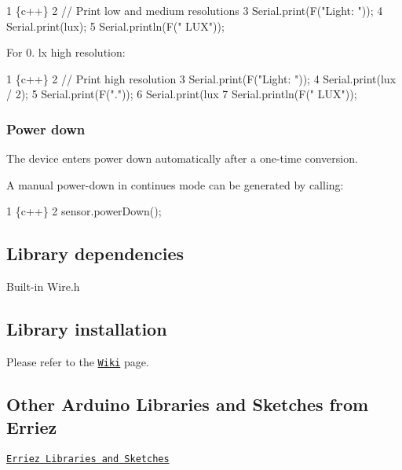 \begin{DoxyCode}
1 \{c++\}
2 // Print low and medium resolutions
3 Serial.print(F("Light: "));
4 Serial.print(lux);
5 Serial.println(F(" LUX"));
\end{DoxyCode}


For 0. lx high resolution\+:


\begin{DoxyCode}
1 \{c++\}
2 // Print high resolution
3 Serial.print(F("Light: "));
4 Serial.print(lux / 2);
5 Serial.print(F("."));
6 Serial.print(lux %
7 Serial.println(F(" LUX"));
\end{DoxyCode}


\subsubsection*{Power down}

The device enters power down automatically after a one-\/time conversion.

A manual power-\/down in continues mode can be generated by calling\+:


\begin{DoxyCode}
1 \{c++\}
2 sensor.powerDown();
\end{DoxyCode}


\subsection*{Library dependencies}


\begin{DoxyItemize}
\item Built-\/in {\ttfamily Wire.\+h}
\end{DoxyItemize}

\subsection*{Library installation}

Please refer to the \href{https://github.com/Erriez/ErriezArduinoLibrariesAndSketches/wiki}{\tt Wiki} page.

\subsection*{Other Arduino Libraries and Sketches from Erriez}


\begin{DoxyItemize}
\item \href{https://github.com/Erriez/ErriezArduinoLibrariesAndSketches}{\tt Erriez Libraries and Sketches} 
\end{DoxyItemize}